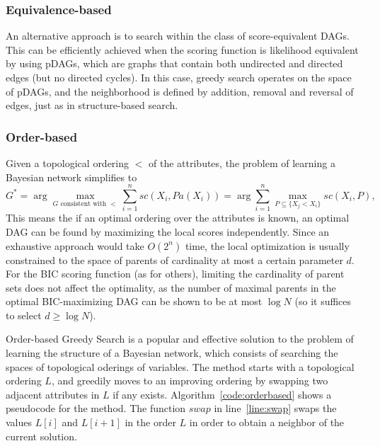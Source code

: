 \subsubsection{Equivalence-based}
\label{subsub:equivalencebased}


An alternative approach is to search within the class of
score-equivalent DAGs. This can be efficiently achieved when the scoring
function is likelihood equivalent by using pDAGs, which are graphs that contain both undirected and directed edges (but no directed cycles). In this case, greedy search operates on the space of pDAGs, and the neighborhood is defined by addition, removal and reversal of edges, just as in structure-based search. 

\subsubsection{Order-based}
\label{subsub:orderbased}
Given a topological ordering $<$ of the attributes, the problem of learning a Bayesian network simplifies to 
\begin{equation}
  \label{eq:orderreduced}
  G^* = \arg\max_{G \text{ consistent with } <} \sum_{i=1}^{n} {sc}( X_i , {Pa}( X_i ) ) = \arg \sum_{i=1}^{n} \max_{P \subseteq \{ X_j < X_i \}} {sc}( X_i , P ) ,
\end{equation}
This means the if an optimal ordering over the attributes is known, an
optimal DAG can be found by maximizing the local scores
independently. Since an exhaustive approach would take $O(2^n)$ time,
the local optimization is usually constrained to the space of parents of
cardinality at most a certain parameter $d$. For the BIC scoring
function (as for others), limiting the cardinality of parent sets does
not affect the optimality, as the number of maximal parents in the
optimal BIC-maximizing DAG can be shown to be at most $\log N$ (so it
suffices to select $d \geq \log N$).


Order-based Greedy Search is a popular and effective solution to the
problem of learning the structure of a Bayesian network, which consists
of searching the spaces of topological oderings of variables. The method
starts with a topological ordering $L$, and greedily moves to an
improving ordering by swapping two adjacent attributes in $L$ if any
exists. Algorithm~\ref{code:orderbased} shows a pseudocode for the
method. The function ${swap}$ in line~\ref{line:swap} swaps the values
$L[ i ]$ and $L[ i + 1 ]$ in the order $L$ in order to obtain a neighbor
of the current solution.

